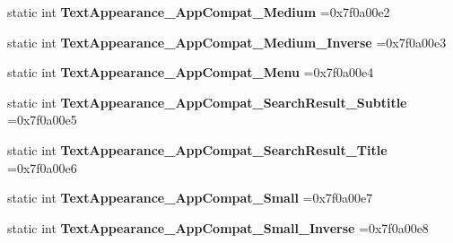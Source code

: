 \begin{DoxyCompactItemize}
\mbox{\label{classandroid_1_1support_1_1graphics_1_1drawable_1_1R_1_1style_a8fe9902817ca6224b7e7711a11011c67}} 
static int {\bfseries Text\+Appearance\+\_\+\+App\+Compat\+\_\+\+Medium} =0x7f0a00e2
\item 
\mbox{\label{classandroid_1_1support_1_1graphics_1_1drawable_1_1R_1_1style_a97bf1d2fdca16c733117283bc6d5fe68}} 
static int {\bfseries Text\+Appearance\+\_\+\+App\+Compat\+\_\+\+Medium\+\_\+\+Inverse} =0x7f0a00e3
\item 
\mbox{\label{classandroid_1_1support_1_1graphics_1_1drawable_1_1R_1_1style_ac80d6f095b1979f530f8284828f98a6b}} 
static int {\bfseries Text\+Appearance\+\_\+\+App\+Compat\+\_\+\+Menu} =0x7f0a00e4
\item 
\mbox{\label{classandroid_1_1support_1_1graphics_1_1drawable_1_1R_1_1style_a443e31f7ad3048fbd818e367d0460dca}} 
static int {\bfseries Text\+Appearance\+\_\+\+App\+Compat\+\_\+\+Search\+Result\+\_\+\+Subtitle} =0x7f0a00e5
\item 
\mbox{\label{classandroid_1_1support_1_1graphics_1_1drawable_1_1R_1_1style_a84658a0f940f3fde487161ed1b709138}} 
static int {\bfseries Text\+Appearance\+\_\+\+App\+Compat\+\_\+\+Search\+Result\+\_\+\+Title} =0x7f0a00e6
\item 
\mbox{\label{classandroid_1_1support_1_1graphics_1_1drawable_1_1R_1_1style_a4833e830e53dcd2ac09c1e80eb108c25}} 
static int {\bfseries Text\+Appearance\+\_\+\+App\+Compat\+\_\+\+Small} =0x7f0a00e7
\item 
\mbox{\label{classandroid_1_1support_1_1graphics_1_1drawable_1_1R_1_1style_a1d2507609c285a7c6c4e27273cb70e37}} 
static int {\bfseries Text\+Appearance\+\_\+\+App\+Compat\+\_\+\+Small\+\_\+\+Inverse} =0x7f0a00e8
\item 
\mbox{\label{classandroid_1_1support_1_1graphics_1_1drawable_1_1R_1_1style_aa60d629c4d0180ebf466d05b2671479d}} 

\end{DoxyCompactItemize}
